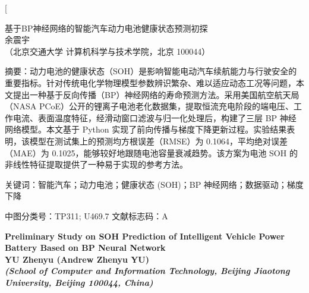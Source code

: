 \documentclass[twocolumn,10pt,a4paper,twoside]{ctexart}
\begin{document}
\twocolumn[
    \begin{center}
         \heiti 基于BP神经网络的智能汽车动力电池健康状态预测初探 \\
        \vspace{1.2em}
         \kaishu 余震宇 \\
        \vspace{0.5em}
         \songti （北京交通大学 计算机科学与技术学院，北京 100044）
    \end{center}

    \vspace{1em}
    \noindent {} \heiti 摘\quad 要：\kaishu 动力电池的健康状态（SOH）是影响智能电动汽车续航能力与行驶安全的重要指标。针对传统电化学物理模型参数辨识繁杂、难以适应动态工况等问题，本文提出一种基于反向传播（BP）神经网络的寿命预测方法。采用美国航空航天局（NASA PCoE）公开的锂离子电池老化数据集，提取恒流充电阶段的端电压、工作电流、表面温度特征，经滑动窗口滤波与归一化处理后，构建了三层 BP 神经网络模型。本文基于 Python 实现了前向传播与梯度下降更新过程。实验结果表明，该模型在测试集上的预测均方根误差（RMSE）为 0.1064，平均绝对误差（MAE）为 0.1025，能够较好地跟随电池容量衰减趋势。该方案为电池 SOH 的非线性特征提取提供了一种易于实现的参考方法。

    \vspace{0.5em}
    \noindent {} \heiti 关键词：\kaishu 智能汽车；动力电池；健康状态 (SOH)；BP 神经网络；数据驱动；梯度下降

    \vspace{0.5em}
    \noindent {} \heiti 中图分类号：\rmfamily TP311; U469.7 \qquad \heiti 文献标志码：\rmfamily A

    \vspace{1.5em}

    \begin{center}
         \bfseries Preliminary Study on SOH Prediction of Intelligent Vehicle Power Battery Based on BP Neural Network \\
        \vspace{1.2em}
         YU Zhenyu (Andrew Zhenyu YU) \\
        \vspace{0.5em}
         \itshape (School of Computer and Information Technology, Beijing Jiaotong University, Beijing 100044, China)
    \end{center}
\end{document}
